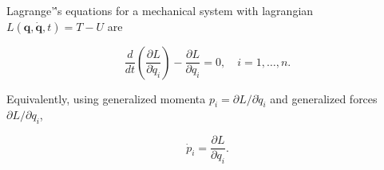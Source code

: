 Lagrange'\''s equations for a mechanical system with lagrangian $L(\mathbf{q}, \dot{\mathbf{q}}, t) = T - U$ are

$$\frac{d}{dt} \left( \frac{\partial L}{\partial \dot{q}_i} \right) - \frac{\partial L}{\partial q_i} = 0, \quad i = 1, \ldots, n.$$

Equivalently, using generalized momenta $p_i = \partial L / \partial \dot{q}_i$ and generalized forces $\partial L / \partial q_i$,

$$\dot{p}_i = \frac{\partial L}{\partial q_i}.$$

